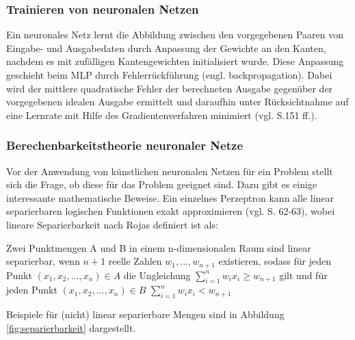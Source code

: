 \documentclass[
	twoside,
	12pt,
	a4paper,
	BCOR10mm,
	DIV14,
	listof=totoc,
	bibliography=totoc,
	headsepline
]{scrreprt}
\begin{document}
\subsubsection{Trainieren von neuronalen Netzen}
Ein neuronales Netz lernt die Abbildung zwischen den vorgegebenen Paaren von Eingabe- und Ausgabedaten durch Anpassung der Gewichte an den Kanten, nachdem es mit zufälligen Kantengewichten initialisiert wurde.
Diese Anpassung geschieht beim MLP durch Fehlerrückführung (engl. backpropagation). Dabei wird der mittlere quadratische Fehler der berechneten Ausgabe gegenüber der vorgegebenen idealen Ausgabe ermittelt und daraufhin unter Rücksichtnahme auf eine Lernrate mit Hilfe des Gradientenverfahren minimiert (vgl. \cite{Rojas:1996:NNS:235222} S.151 ff.).

\subsubsection{Berechenbarkeitstheorie neuronaler Netze}
Vor der Anwendung von künstlichen neuronalen Netzen für ein Problem stellt sich die Frage, ob diese für das Problem geeignet sind. Dazu gibt es einige interessante mathematische Beweise.
Ein einzelnes Perzeptron kann alle linear separierbaren logischen Funktionen exakt approximieren (vgl. \cite{Rojas:1996:NNS:235222} S. 62-63), wobei lineare Separierbarkeit nach Rojas definiert ist als:

Zwei Punktmengen A und B in einem n-dimensionalen Raum sind linear separierbar, wenn $n + 1$ reelle Zahlen $w_1,...,w_{n+1}$ existieren, sodass für jeden Punkt $(x_1,x_2,...,x_n) \in A$ die Ungleichung $\sum_{i=1}^{n} w_ix_i \ge w_{n+1}$ gilt und für jeden Punkt $(x_1,x_2,...,x_n) \in B$ $\sum_{i=1}^{n} w_ix_i < w_{n+1}$\medskip

Beispiele für (nicht) linear separierbare Mengen sind in Abbildung \ref{fig:separierbarkeit} dargestellt.
\end{document}

